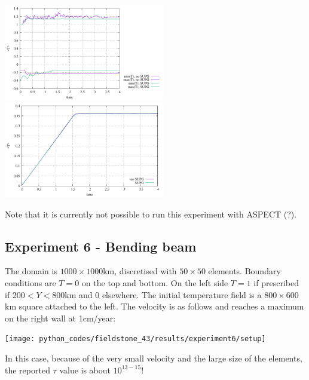 \begin{center}
\includegraphics[width=7cm]{python_codes/fieldstone_43/results/experiment5/stats_T}
\includegraphics[width=7cm]{python_codes/fieldstone_43/results/experiment5/avrg_T}
\end{center}

Note that it is currently not possible to run this experiment with ASPECT (?).

\subsection*{Experiment 6 - Bending beam}

The domain is $1000\times1000$km, discretised with $50\times50$ elements. Boundary conditions are
$T=0$ on the top and bottom. On the left side $T=1$ if prescribed if $200<Y<800$km and 0 elsewhere.
The initial temperature field is a $800\times600$km square attached to the left.
The velocity is as follows and reaches a maximum on the right wall at 1cm/year:

\begin{center}
\texttt{[image: python\_codes/fieldstone\_43/results/experiment6/setup]}
\end{center}

In this case, because of the very small velocity and the large size of the elements,  
the reported $\tau$ value is about $10^{13-15}$! 

